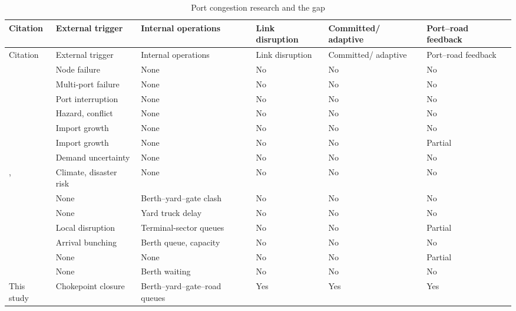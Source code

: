 \documentclass[a4paper,fleqn]{cas-sc}
\begin{document}
\begin{longtable}{>{\RaggedRight\arraybackslash}p{}
                  >{\RaggedRight\arraybackslash}p{}
                  >{\RaggedRight\arraybackslash}p{}
                  >{\Centering\arraybackslash}p{}
                  >{\Centering\arraybackslash}p{}
                  >{\Centering\arraybackslash}p{}
                }
\caption{Port congestion research and the gap}\label{tab:congestion_causes}\\
\toprule
Citation & External trigger & Internal operations & Link disruption & Committed/ adaptive & Port--road feedback \\
\midrule
\endfirsthead
\toprule
Citation & External trigger & Internal operations & Link disruption & Committed/ adaptive & Port--road feedback \\
\midrule
\endhead
\bottomrule
\endfoot
\citet{XuEtAl2022}       & Node failure          & None                    & No  & No  & No \\
\citet{XuEtAl2025}       & Multi-port failure    & None                    & No  & No  & No \\
\citet{LuEtAl2024}       & Port interruption     & None                    & No  & No  & No \\
\citet{CaoEtAl2025}      & Hazard, conflict      & None                    & No  & No  & No \\
\citet{FanEtAl2012}      & Import growth         & None                    & No  & No  & No \\
\citet{LeachmanJula2011} & Import growth         & None                    & No  & No  & Partial \\
\citet{ChenLiu2016}      & Demand uncertainty    & None                    & No  & No  & No \\
\citet{WangZhang2018}, \citet{XiaEtAl2024} & Climate, disaster risk & None & No & No & No \\
\citet{TalleyNg2016}     & None                  & Berth--yard--gate clash & No  & No  & No \\
\citet{Zhen2016}         & None                  & Yard truck delay        & No  & No  & No \\
\citet{ZhangEtAl2025}    & Local disruption      & Terminal-sector queues  & No  & No  & Partial \\
\citet{LeiJia2026}       & Arrival bunching      & Berth queue, capacity   & No  & No  & No \\
\citet{WanEtAl2016}      & None                  & None                    & No  & No  & Partial \\
\citet{YangEtAl2025}     & None                  & Berth waiting           & No  & No  & No \\
\midrule
This study     & Chokepoint closure & Berth--yard--gate--road queues & Yes & Yes & Yes \\
\end{longtable}
\end{document}
